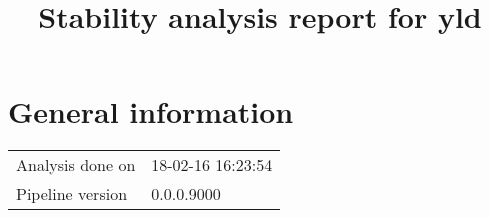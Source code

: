 \documentclass[a4paper,11pt]{article}\usepackage[]{graphicx}\usepackage[]{color}
\title{Stability analysis report for yld}%
\author{\vspace{-5ex}}
\date{\vspace{-5ex}}
\begin{document}
\maketitle
\singlespacing

\section{General information}
\begin{table}[ht]
\begin{flushleft}
\begin{tabular}{ll}
  Analysis done on & 18-02-16 16:23:54 \\ 
  Pipeline version & 0.0.0.9000 \\ 
  \end{tabular}
\label{general}
\end{flushleft}
\end{table}


\end{document}
